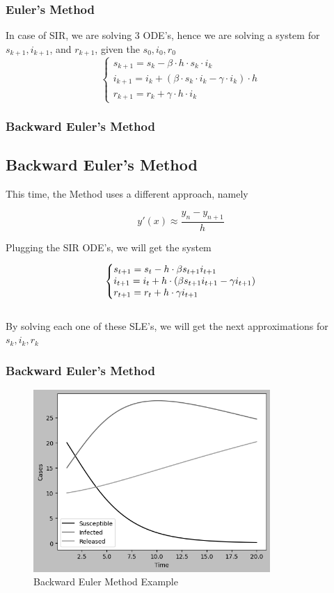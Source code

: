 \documentclass{beamer}
\makeatletter
\newenvironment{system}%
{\left\lbrace\begin{array}{@{}l@{}}}%
{\end{array}\right.}
\makeatother
\begin{document}
\begin{frame}\frametitle{Euler's Method}
In case of SIR, we are solving 3 ODE's, hence we are solving a system
for $s_{k+1}, i_{k+1}$, and $r_{k+1}$, given the $s_0, i_0, r_0$
\vspace{0.7cm}
\Large
\[
	\left\{
		\begin{array}{l}
			s_{k+1}=s_k - \beta \cdot h \cdot s_k \cdot i_k \\
			i_{k+1}=i_k + (\beta \cdot s_k \cdot i_k - \gamma \cdot i_k) \cdot h \\
			r_{k+1}=r_k+ \gamma \cdot h \cdot i_k
		\end{array}
	\right.
\]
\end{frame}

\begin{frame}\frametitle{Backward Euler's Method}
\subsection{Backward Euler's Method}
This time, the Method uses a different approach, namely

\begin{equation*}
	y'(x) \approx \frac{y_n-y_{n+1}}{h}
\end{equation*}

Plugging the SIR ODE's, we will get the system

    \begin{equation*}
        \begin{system}
        s_{t+1} = s_t - h \cdot \beta s_{t+1} i_{t+1}
        \\
        i_{t+1} = i_t + h \cdot (\beta s_{t+1} i_{t+1} - \gamma i_{t+1})
        \\
        r_{t+1}= r_t + h\cdot \gamma i_{t+1}
        \end{system}
    \end{equation*}
    \vspace{0.3cm}
\\
    By solving each one of these SLE's, we will get the next approximations for $s_k,i_k,r_k$
\end{frame}

\begin{frame}\frametitle{Backward Euler's Method}
    \begin{figure}
        \caption{Backward Euler Method Example}
        \centering
        \includegraphics[width=9cm]{Figure_BackwardsEuler.png}
    \end{figure}
\end{frame}
\end{document}
